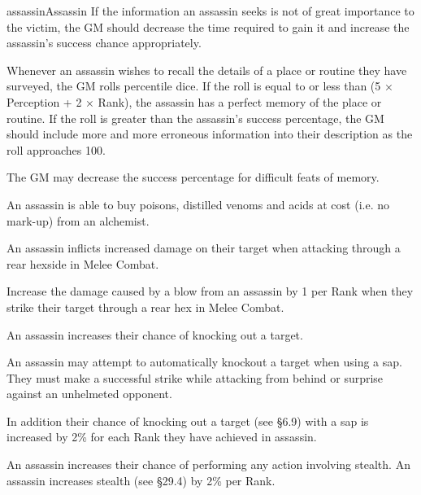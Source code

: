 \begin{Skill}{assassin}{Assassin}
If the information an assassin seeks is not of great importance to the
victim, the GM should decrease the time required to gain it and
increase the assassin’s success chance appropriately.


Whenever an assassin wishes to recall the details of a place or
routine they have surveyed, the GM rolls percentile dice.  If the roll
is equal to or less than (5 × Perception + 2 × Rank), the assassin has
a perfect memory of the place or routine. If the roll is greater than
the assassin’s success percentage, the GM should include more and more
erroneous information into their description as the roll approaches
100.

The GM may decrease the success percentage for difficult feats of
memory.


An assassin is able to buy poisons, distilled venoms and acids at cost
(i.e. no mark-up) from an alchemist.


An assassin inflicts increased damage on their target when attacking
through a rear hexside in Melee Combat.

Increase the damage caused by a blow from an assassin by 1 per Rank
when they strike their target through a rear hex in Melee Combat.


An assassin increases their chance of knocking out a target.

An assassin may attempt to automatically knockout a target when using
a sap.  They must make a successful strike while attacking from behind
or surprise against an unhelmeted opponent.

In addition their chance of knocking out a target (see §6.9) with a
sap is increased by 2\% for each Rank they have achieved in assassin.


An assassin increases their chance of performing any action involving
stealth.  An assassin increases stealth (see §29.4) by 2\% per Rank.

\end{Skill}
